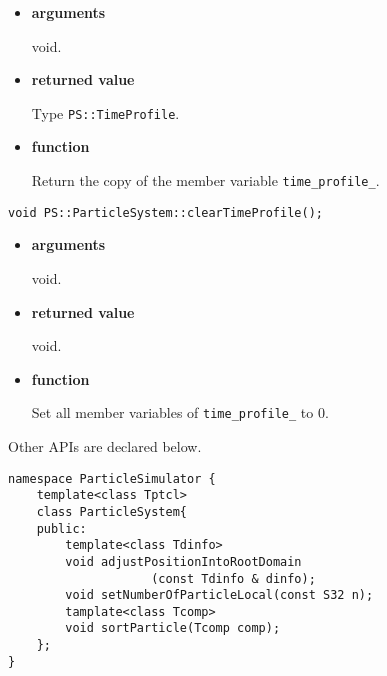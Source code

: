 \begin{itemize}

\item {\bf arguments}

void.

\item {\bf returned value}

Type {\tt PS::TimeProfile}.

\item {\bf function}

Return the copy of the member variable {\tt time\_profile\_}.


\end{itemize}

\begin{screen}
\begin{verbatim}
void PS::ParticleSystem::clearTimeProfile();
\end{verbatim}
\end{screen}

\begin{itemize}

\item {\bf arguments}

void.

\item {\bf returned value}

void.

\item {\bf function}

Set all member variables of {\tt time\_profile\_} to 0.


\end{itemize}



Other APIs are declared below.

\begin{lstlisting}[caption=ParticleSystem4]
namespace ParticleSimulator {
    template<class Tptcl>
    class ParticleSystem{
    public:
        template<class Tdinfo>
        void adjustPositionIntoRootDomain
                    (const Tdinfo & dinfo);
        void setNumberOfParticleLocal(const S32 n);
        tamplate<class Tcomp>
        void sortParticle(Tcomp comp);
    };
}
\end{lstlisting}

